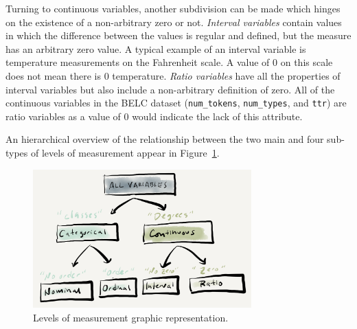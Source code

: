 \documentclass[
  letterpaper,
]{latex/krantz}
\begin{document}
Turning to continuous variables, another subdivision can be made which
hinges on the existence of a non-arbitrary zero or not. \emph{Interval
variables} contain values in which the difference between the values is
regular and defined, but the measure has an arbitrary zero value. A
typical example of an interval variable is temperature measurements on
the Fahrenheit scale. A value of 0 on this scale does not mean there is
0 temperature. \emph{Ratio variables} have all the properties of
interval variables but also include a non-arbitrary definition of zero.
All of the continuous variables in the BELC dataset
(\texttt{num\_tokens}, \texttt{num\_types}, and \texttt{ttr}) are ratio
variables as a value of 0 would indicate the lack of this attribute.

An hierarchical overview of the relationship between the two main and
four sub-types of levels of measurement appear in
Figure~\ref{fig-info-values-paper}.

\begin{figure}[h]

{\centering \includegraphics[width=0.75\textwidth,height=\textheight]{figures/approaching-analysis/Informational-values-paper.png}

}

\caption{\label{fig-info-values-paper}Levels of measurement graphic
representation.}

\end{figure}
\end{document}
